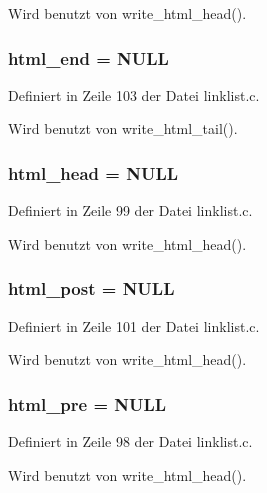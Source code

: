 Wird benutzt von write\_\-html\_\-head().
\subsubsection{ {\bf html\_\-end} = NULL}\label{linklist_8c_d7f0906501b524d986d95f8efddb48e5}




Definiert in Zeile 103 der Datei linklist.c.

Wird benutzt von write\_\-html\_\-tail().
\subsubsection{ {\bf html\_\-head} = NULL}\label{linklist_8c_1811e9595e278ef4ac307d06cd3a4eed}




Definiert in Zeile 99 der Datei linklist.c.

Wird benutzt von write\_\-html\_\-head().
\subsubsection{ {\bf html\_\-post} = NULL}\label{linklist_8c_fd6de839e46d75632279853537235e7c}




Definiert in Zeile 101 der Datei linklist.c.

Wird benutzt von write\_\-html\_\-head().
\subsubsection{ {\bf html\_\-pre} = NULL}\label{linklist_8c_cea32428cfbcce0e252dd3613586d0f3}




Definiert in Zeile 98 der Datei linklist.c.

Wird benutzt von write\_\-html\_\-head().
